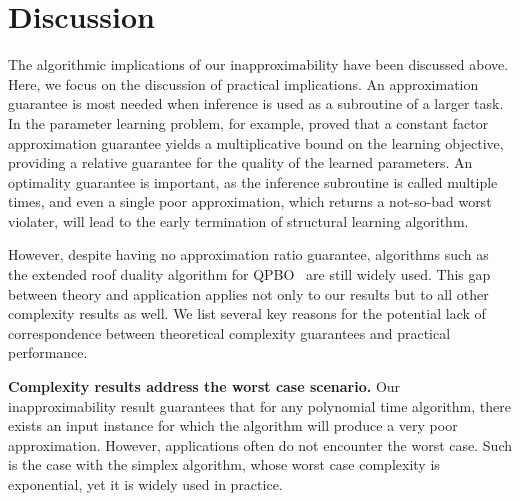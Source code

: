 \section{Discussion}\label{sec:discussion}

The algorithmic implications of our inapproximability have been discussed above. Here, we focus on the discussion of practical implications. 
An approximation guarantee is most needed when inference is used as a subroutine of a larger task. In the parameter learning problem, for example, %
\citet{finley2008training} proved that a constant factor approximation guarantee yields a multiplicative bound on the learning objective, providing a relative guarantee for the quality of the learned parameters. An optimality guarantee is important, as the inference subroutine is called multiple times, and even a single poor approximation, which returns a not-so-bad worst violater, will lead to the early termination of structural learning algorithm. 

However, despite having no approximation ratio guarantee, algorithms such as the extended roof duality algorithm for QPBO~\cite{rother2007optimizing} are still widely used. This gap between theory and application applies not only to our results but to all other complexity results as well. We list several key reasons for the potential lack of correspondence between theoretical complexity guarantees and practical performance.

\textbf{Complexity results address the worst case scenario.} Our inapproximability result guarantees that for any polynomial time algorithm, there exists an input instance for which the algorithm will produce a very poor approximation. However, applications often do not encounter the worst case. Such is the case with the simplex algorithm, whose worst case complexity is exponential, yet it is widely used in practice. 


